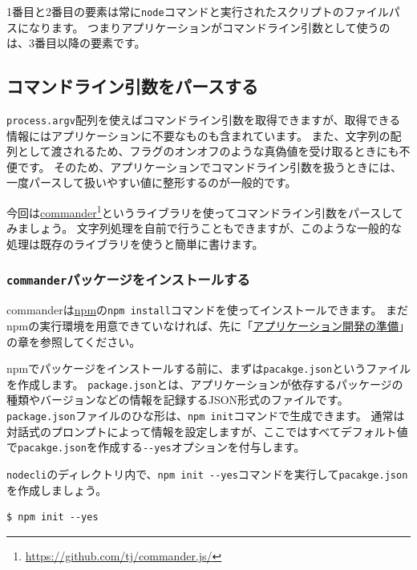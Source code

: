 1番目と2番目の要素は常に\texttt{node}コマンドと実行されたスクリプトのファイルパスになります。
つまりアプリケーションがコマンドライン引数として使うのは、3番目以降の要素です。

\hypertarget{parse-args}{%
\subsection{コマンドライン引数をパースする}\label{parse-args}}

\texttt{process.argv}配列を使えばコマンドライン引数を取得できますが、取得できる情報にはアプリケーションに不要なものも含まれています。
また、文字列の配列として渡されるため、フラグのオンオフのような真偽値を受け取るときにも不便です。
そのため、アプリケーションでコマンドライン引数を扱うときには、一度パースして扱いやすい値に整形するのが一般的です。

今回は\href{https://github.com/tj/commander.js/}{commander}\footnote{\url{https://github.com/tj/commander.js/}}というライブラリを使ってコマンドライン引数をパースしてみましょう。
文字列処理を自前で行うこともできますが、このような一般的な処理は既存のライブラリを使うと簡単に書けます。

\hypertarget{install-commander}{%
\subsubsection{\texorpdfstring{\texttt{commander}パッケージをインストールする}{commanderパッケージをインストールする}}\label{install-commander}}

commanderは\href{https://www.npmjs.com/}{npm}の\texttt{npm install}コマンドを使ってインストールできます。
まだnpmの実行環境を用意できていなければ、先に「\hyperlink{setup-local-env}{アプリケーション開発の準備}」の章を参照してください。

npmでパッケージをインストールする前に、まずは\texttt{pacakge.json}というファイルを作成します。
\texttt{package.json}とは、アプリケーションが依存するパッケージの種類やバージョンなどの情報を記録するJSON形式のファイルです。
\texttt{package.json}ファイルのひな形は、\texttt{npm init}コマンドで生成できます。
通常は対話式のプロンプトによって情報を設定しますが、ここではすべてデフォルト値で\texttt{pacakge.json}を作成する\texttt{-\/-yes}オプションを付与します。

\texttt{nodecli}のディレクトリ内で、\texttt{npm init -\/-yes}コマンドを実行して\texttt{pacakge.json}を作成しましょう。

\begin{lstlisting}
$ npm init --yes
\end{lstlisting}

